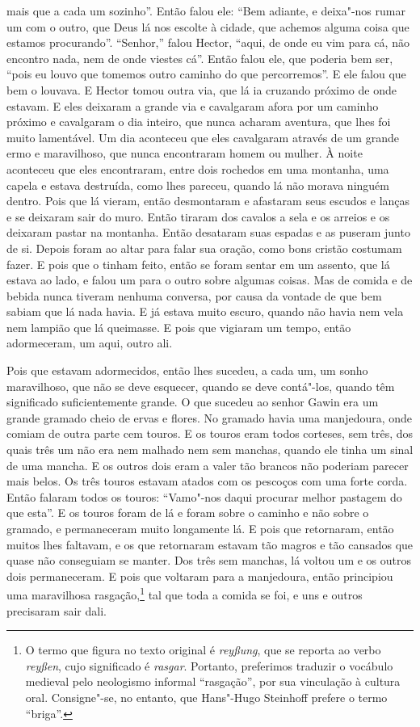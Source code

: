 mais que a cada um sozinho”. Então falou ele: “Bem adiante, e deixa"-nos rumar
um com o outro, que Deus lá nos escolte à cidade, que achemos alguma coisa que
estamos procurando”. “Senhor,” falou Hector, “aqui, de onde eu vim para cá, não
encontro nada, nem de onde viestes cá”. Então falou ele, que poderia bem ser,
“pois eu louvo que tomemos outro caminho do que percorremos”. E ele falou que
bem o louvava. E Hector tomou outra via, que lá ia cruzando próximo de onde
estavam. E eles deixaram a grande via e cavalgaram afora por um caminho próximo
e cavalgaram o dia inteiro, que nunca acharam aventura, que lhes foi muito
lamentável. Um dia aconteceu que eles cavalgaram através de um grande ermo e
maravilhoso, que nunca encontraram homem ou mulher. À noite aconteceu que eles
encontraram, entre dois rochedos em uma montanha, uma capela e estava
destruída, como lhes pareceu, quando lá não morava ninguém dentro. Pois que lá
vieram, então desmontaram e afastaram seus escudos e lanças e se deixaram sair
do muro. Então tiraram dos cavalos a sela e os arreios e os deixaram pastar na
montanha. Então desataram suas espadas e as puseram junto de si. Depois foram
ao altar para falar sua oração, como bons cristão costumam fazer. E
pois que o tinham feito, então se foram sentar em um assento, que lá estava ao
lado, e falou um para o outro sobre algumas coisas. Mas de comida e de bebida
nunca tiveram nenhuma conversa, por causa da vontade de que bem sabiam que lá
nada havia. E já estava muito escuro, quando não havia nem vela nem lampião que
lá queimasse. E pois que vigiaram um tempo, então adormeceram, um aqui, outro
ali.

Pois que estavam adormecidos, então lhes sucedeu, a cada um, um sonho
maravilhoso, que não se deve esquecer, quando se deve contá"-los, quando têm
significado suficientemente grande. O que sucedeu ao senhor Gawin era um grande
gramado cheio de ervas e flores. No gramado havia uma manjedoura, onde comiam
de outra parte cem touros. E os touros eram todos corteses, sem três, dos quais
três um não era nem malhado nem sem manchas, quando ele tinha um sinal de uma
mancha. E os outros dois eram a valer tão brancos não poderiam parecer mais
belos. Os três touros estavam atados com os pescoços com uma forte corda. Então
falaram todos os touros: “Vamo"-nos daqui procurar melhor pastagem do que esta”.
E os touros foram de lá e foram sobre o caminho e não sobre o gramado, e
permaneceram muito longamente lá. E pois que retornaram, então muitos lhes
faltavam, e os que retornaram estavam tão magros e tão cansados que quase não
conseguiam se manter. Dos três sem manchas, lá voltou um e os outros dois
permaneceram. E pois que voltaram para a manjedoura, então principiou uma
maravilhosa rasgação,\footnote{ O termo que figura no texto original é
\textit{reyßung}, que se reporta ao verbo\textit{ reyßen},  cujo significado 
é \textit{rasgar}. Portanto,
preferimos traduzir o vocábulo medieval pelo neologismo informal “rasgação”,
por sua vinculação à cultura oral. Consigne"-se, no entanto, que Hans"-Hugo
Steinhoff prefere o termo “briga”.}  tal que
toda a comida se foi, e uns e outros precisaram sair dali. 

